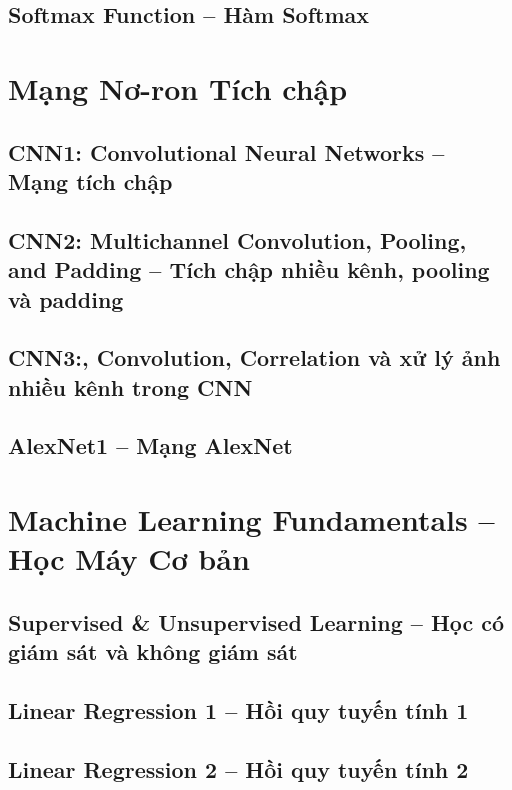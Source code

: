 \documentclass[12pt,a4paper]{report}
\begin{document}
\chapter{Softmax Function -- Hàm Softmax}


\part{Mạng Nơ-ron Tích chập}
\setcounter{chapter}{0}

\chapter{CNN1: Convolutional Neural Networks -- Mạng tích chập}


\chapter{CNN2: Multichannel Convolution, Pooling, and Padding -- Tích chập nhiều kênh, pooling và padding}


\chapter{CNN3:, Convolution, Correlation và xử lý ảnh nhiều kênh trong CNN}


\chapter{AlexNet1 -- Mạng AlexNet}


\part{Machine Learning Fundamentals -- Học Máy Cơ bản}
\setcounter{chapter}{0}

\chapter{Supervised \& Unsupervised Learning -- Học có giám sát và không giám sát}


\chapter{Linear Regression 1 -- Hồi quy tuyến tính 1}


\chapter{Linear Regression 2 -- Hồi quy tuyến tính 2}

\end{document}
